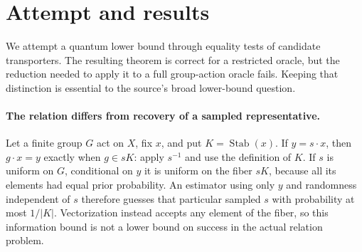 \documentclass[11pt]{article}
\begin{document}
\section{Attempt and results}
We attempt a quantum lower bound through equality tests of candidate
transporters. The resulting theorem is correct for a restricted oracle, but
the reduction needed to apply it to a full group-action oracle fails. Keeping
that distinction is essential to the source's broad lower-bound question.

\paragraph{The relation differs from recovery of a sampled representative.}
Let a finite group $G$ act on $X$, fix $x$, and put $K=\operatorname{Stab}(x)$.
If $y=s\cdot x$, then $g\cdot x=y$ exactly when $g\in sK$:
apply $s^{-1}$ and use the definition of $K$.
If $s$ is uniform on $G$, conditional on $y$ it is uniform on the fiber $sK$,
because all its elements had equal prior probability. An estimator using only
$y$ and randomness independent of $s$ therefore guesses that particular
sampled $s$ with probability at most $1/|K|$. Vectorization instead accepts
any element of the fiber, so this information bound is not a lower bound on
success in the actual relation problem.
\end{document}

